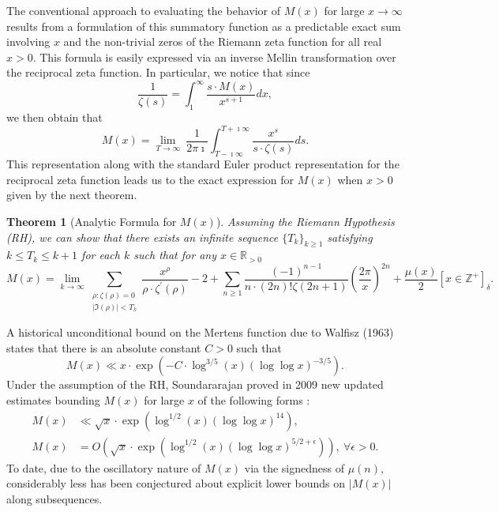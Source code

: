 \documentclass[11pt,reqno,a4letter]{article}
\numberwithin{figure}{section}
\numberwithin{table}{section}
\newcommand{\Iverson}[1]{\ensuremath{\left[#1\right]_{\delta}}}
\theoremstyle{plain}
\newtheorem{theorem}{Theorem}
\numberwithin{theorem}{section}
\theoremstyle{definition}
\begin{document}
The conventional approach to evaluating the behavior of $M(x)$ for large 
$x \rightarrow \infty$ results from a formulation of this summatory 
function as a predictable exact sum involving $x$ and the non-trivial 
zeros of the Riemann zeta function for all real $x > 0$. 
This formula is easily expressed via an inverse Mellin transformation 
over the reciprocal zeta function. In particular, 
we notice that since 
\[
\frac{1}{\zeta(s)} = \int_1^{\infty} \frac{s \cdot M(x)}{x^{s+1}} dx, 
\]
we then obtain that 
\[
M(x) = \lim_{T \rightarrow \infty}\ \frac{1}{2\pi\imath} \int_{T-\imath\infty}^{T+\imath\infty} 
     \frac{x^s}{s \cdot \zeta(s)} ds. 
\] 
This representation along with the standard Euler product 
representation for the reciprocal zeta function leads us to the 
exact expression for $M(x)$ when $x > 0$ given by the next theorem. 

\begin{theorem}[Analytic Formula for $M(x)$] 
\label{theorem_MxMellinTransformInvFormula} 
Assuming the Riemann Hypothesis (RH), we can show that there exists an infinite sequence 
$\{T_k\}_{k \geq 1}$ satisfying $k \leq T_k \leq k+1$ for each $k$ 
such that for any $x \in \mathbb{R}_{>0}$ 
\[
M(x) = \lim_{k \rightarrow \infty} 
     \sum_{\substack{\rho: \zeta(\rho) = 0 \\ |\Im(\rho)| < T_k}} 
     \frac{x^{\rho}}{\rho \cdot \zeta^{\prime}(\rho)} - 2 + 
     \sum_{n \geq 1} \frac{(-1)^{n-1}}{n \cdot (2n)! \zeta(2n+1)} 
     \left(\frac{2\pi}{x}\right)^{2n} + 
     \frac{\mu(x)}{2} \Iverson{x \in \mathbb{Z}^{+}}. 
\] 
\end{theorem} 

A historical unconditional bound on the Mertens function due to Walfisz (1963) 
states that there is an absolute constant $C > 0$ such that 
$$M(x) \ll x \cdot \exp\left(-C \cdot \log^{3/5}(x) 
  (\log\log x)^{-3/5}\right).$$ 
Under the assumption of the RH, Soundararajan proved in 2009 new updated estimates 
bounding $M(x)$ for large $x$ of the following forms \cite{SOUND-MERTENS-ANNALS}: 
\begin{align*} 
M(x) & \ll \sqrt{x} \cdot \exp\left(\log^{1/2}(x) (\log\log x)^{14}\right), \\ 
M(x) & = O\left(\sqrt{x} \cdot \exp\left( 
     \log^{1/2}(x) (\log\log x)^{5/2+\epsilon}\right)\right),\ 
     \forall \epsilon > 0. 
\end{align*} 
To date, due to the oscillatory nature of $M(x)$ via the signedness of $\mu(n)$, 
considerably less has been conjectured about explicit lower bounds on $|M(x)|$ along 
subsequences. 
\end{document}
